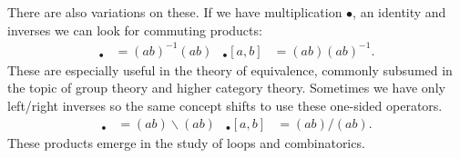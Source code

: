 There are also variations on these.  If we have multiplication $\bullet$, 
an identity and inverses we can look for commuting products:
\begin{align*}
    [a,b]_{\bullet} & =(ab)^{-1}(ab)
    &
    {_{\bullet} [a,b]} & =(ab)(ab)^{-1}.
\end{align*}
These are especially useful in the  theory of equivalence, commonly subsumed 
in the topic of group theory and higher category theory.
Sometimes we have only left/right inverses so the same concept shifts to 
use these one-sided operators.
\begin{align*}
    [a,b]_{\bullet} & =(ab)\backslash (ab)
    &
    {_{\bullet} [a,b]} & =(ab)/(ab).
\end{align*}
These products emerge in the study of loops and combinatorics.

